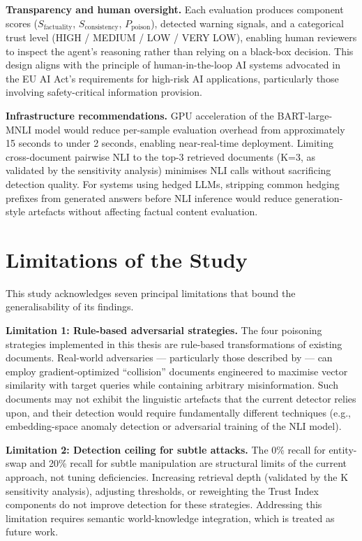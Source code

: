 \textbf{Transparency and human oversight.} Each evaluation produces component scores ($S_{\text{factuality}}$, $S_{\text{consistency}}$, $P_{\text{poison}}$), detected warning signals, and a categorical trust level (HIGH / MEDIUM / LOW / VERY LOW), enabling human reviewers to inspect the agent's reasoning rather than relying on a black-box decision. This design aligns with the principle of human-in-the-loop AI systems advocated in the EU AI Act's requirements for high-risk AI applications, particularly those involving safety-critical information provision.

\textbf{Infrastructure recommendations.} GPU acceleration of the BART-large-MNLI model would reduce per-sample evaluation overhead from approximately 15 seconds to under 2 seconds, enabling near-real-time deployment. Limiting cross-document pairwise NLI to the top-3 retrieved documents (K=3, as validated by the sensitivity analysis) minimises NLI calls without sacrificing detection quality. For systems using hedged LLMs, stripping common hedging prefixes from generated answers before NLI inference would reduce generation-style artefacts without affecting factual content evaluation.

\section{Limitations of the Study}
\label{sec:disc_limitations}

This study acknowledges seven principal limitations that bound the generalisability of its findings.

\textbf{Limitation 1: Rule-based adversarial strategies.}
The four poisoning strategies implemented in this thesis are rule-based transformations of existing documents. Real-world adversaries --- particularly those described by \textcite{zou2024poisoned} --- can employ gradient-optimized ``collision'' documents engineered to maximise vector similarity with target queries while containing arbitrary misinformation. Such documents may not exhibit the linguistic artefacts that the current detector relies upon, and their detection would require fundamentally different techniques (e.g., embedding-space anomaly detection or adversarial training of the NLI model).

\textbf{Limitation 2: Detection ceiling for subtle attacks.}
The 0\% recall for entity-swap and 20\% recall for subtle manipulation are structural limits of the current approach, not tuning deficiencies. Increasing retrieval depth (validated by the K sensitivity analysis), adjusting thresholds, or reweighting the Trust Index components do not improve detection for these strategies. Addressing this limitation requires semantic world-knowledge integration, which is treated as future work.

